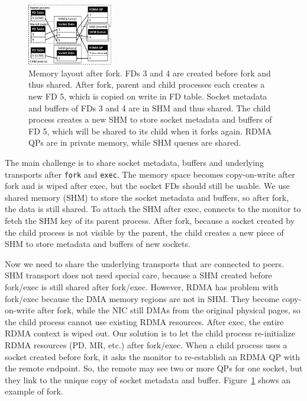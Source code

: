 \begin{figure}[t!]
	\centering
	\includegraphics[width=0.33\textwidth]{images/fork_memory}
	\vspace{-5pt}
	\caption{Memory layout after fork. FDs 3 and 4 are created before fork and thus shared. After fork, parent and child processes each creates a new FD 5, which is copied on write in FD table. Socket metadata and buffers of FDs 3 and 4 are in SHM and thus shared. The child process creates a new SHM to store socket metadata and buffers of FD 5, which will be shared to its child when it forks again. RDMA QPs are in private memory, while SHM queues are shared.}
	\label{fig:fork-memory}
\end{figure}

The main challenge is to share socket metadata, buffers and underlying transports after \texttt{fork} and \texttt{exec}.
The memory space becomes copy-on-write after fork and is wiped after exec, but the socket FDs should still be usable.
We use shared memory (SHM) to store the socket metadata and buffers, so after fork, the data is still shared.
To attach the SHM after exec, \libipc{} connects to the monitor to fetch the SHM key of its parent process.
After fork, because a socket created by the child process is not visible by the parent, the child creates a new piece of SHM to store metadata and buffers of new sockets.

Now we need to share the underlying transports that are connected to peers.
SHM transport does not need special care, because a SHM created before fork/exec is still shared after fork/exec.
However, RDMA has problem with fork/exec because the DMA memory regions are not in SHM.
They become copy-on-write after fork, while the NIC still DMAs from the original physical pages, so the child process cannot use existing RDMA resources.
After exec, the entire RDMA context is wiped out.
Our solution is to let the child process re-initialize RDMA resources (PD, MR, etc.) after fork/exec.
When a child process uses a socket created before fork, it asks the monitor to re-establish an RDMA QP with the remote endpoint.
So, the remote may see two or more QPs for one socket, but they link to the unique copy of socket metadata and buffer.
Figure~\ref{fig:fork-memory} shows an example of fork.

